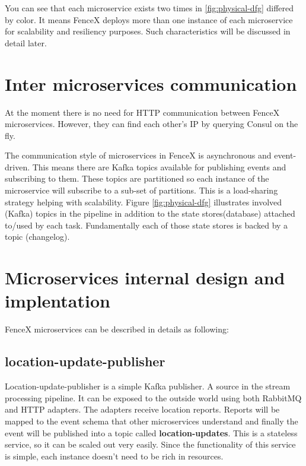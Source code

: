 \documentclass[a4]{report}
\begin{document}
    You can see that each microservice exists two times in \ref{fig:physical-dfg} differed by color.
    It means FenceX deploys more than one instance of each microservice for scalability and resiliency purposes.
    Such characteristics will be discussed in detail later.


    \section{Inter microservices communication}
    At the moment there is no need for HTTP communication between FenceX microservices.
    However, they can find each other's IP by querying Consul\cite{Consul} on the fly.

    The communication style of microservices in FenceX is asynchronous and event-driven.
    This means there are Kafka topics available for publishing events and subscribing to them.
    These topics are partitioned so each instance of the microservice will subscribe to a sub-set of partitions.
    This is a load-sharing strategy helping with scalability.
    Figure \ref{fig:physical-dfg} illustrates involved (Kafka) topics in the pipeline in addition to the state stores(database) attached to/used by each task.
    Fundamentally each of those state stores is backed by a topic (changelog).


    \section{Microservices internal design and implentation}
    FenceX microservices can be described in details as following:

    \subsection{location-update-publisher}
    Location-update-publisher is a simple Kafka publisher.
    A source in the stream processing pipeline.
    It can be exposed to the outside world using both RabbitMQ and HTTP adapters.
    The adapters receive location reports.
    Reports will be mapped to the event schema that other microservices understand and finally the event will be published into a topic called \textbf{location-updates}.
    This is a stateless service, so it can be scaled out very easily.
    Since the functionality of this service is simple, each instance doesn't need to be rich in resources.
\end{document}
